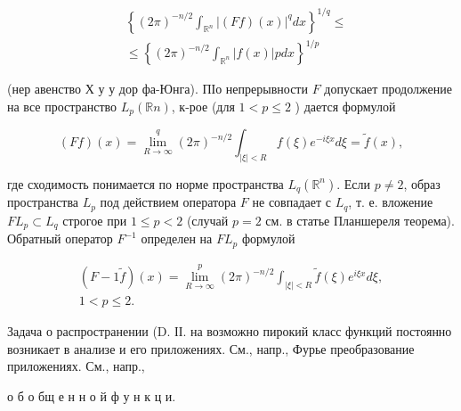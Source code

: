 \documentclass[10pt]{article}
\begin{document}
\[

\begin{aligned}

& \left\{(2 \pi)^{-n / 2} \int_{\mathbb{R}^{n}}|(F f)(x)|^{q} d x\right\}^{1 / q} \leqslant \\

& \leqslant\left\{(2 \pi)^{-n / 2} \int_{\mathbb{R}^{n}}|f(x)| p d x\right\}^{1 / p}

\end{aligned}

\]



(нер авенство Х у у дор фа-Юнга). ПІо непрерывности $F$ допускает продолжение на все пространство $L_{p}(\mathbb{R} n)$, к-рое (для $1<p \leqslant 2$ ) дается формулой



\[

(F f)(x)=\lim _{R \rightarrow \infty}^{q}(2 \pi)^{-n / 2} \int_{|\xi|<R} f(\xi) e^{-i \xi x} d \xi=\tilde{f}(x),

\]



где сходимость понимается по норме пространства $L_{q}\left(\mathbb{R}^{n}\right)$. Если $p \neq 2$, образ пространства $L_{p}$ под действием оператора $F$ не совпадает с $L_{q}$, т. е. вложение $F L_{p} \subset L_{q}$ строгое при $1 \leqslant p<2$ (случай $p=2$ см. в статье Планшереля теорема). Обратный оператор $F^{-1}$ определен на $F L_{p}$ формулой



\[

\begin{gathered}

(F-1 \tilde{f})(x)=\lim _{R \rightarrow \infty}^{p}(2 \pi)^{-n / 2} \int_{|\xi|<R} \tilde{f}(\xi) e^{i \xi x} d \xi, \\

1<p \leqslant 2 .

\end{gathered}

\]



Задача о распространении (D. ІІ. на возможно пирокий класс функций постоянно возникает в анализе и его приложениях. См., напр., Фурье преобразование приложениях. См., напр.,

о б о бщ е н н о й ф у н к ц и.
\end{document}
